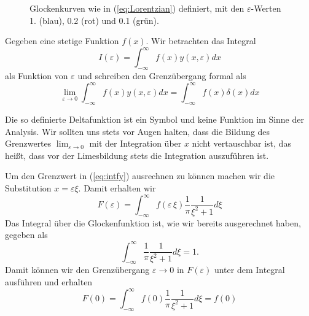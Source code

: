 \begin{figure}
  \begin{center}
  \end{center}
  \caption{\label{fig:Glockenkurven}Glockenkurven wie in (\ref{eq:Lorentzian})
  definiert, mit den $\varepsilon$-Werten 1. (blau), 0.2 (rot) und 0.1 (grün).}
\end{figure}
Gegeben eine stetige Funktion $f(x)$. Wir betrachten das Integral
\[I(\varepsilon)=\int_{-\infty}^{\infty}f(x)y(x,\varepsilon)dx\]
als Funktion von $\varepsilon$ und schreiben den Grenzübergang formal als
\begin{equation}\label{eq:intfy}
  \lim_{\varepsilon\rightarrow 0}\int_{-\infty}^{\infty}f(x)y(x,\varepsilon)dx=
\int_{-\infty}^{\infty}f(x)\delta(x)dx
\end{equation}

Die so definierte Deltafunktion ist ein Symbol und keine Funktion im Sinne der
Analysis. Wir sollten uns stets vor Augen halten, dass die Bildung des
Grenzwertes $\lim_{\varepsilon\rightarrow 0}$ mit der Integration über $x$
nicht vertauschbar ist, das heißt, dass vor der Limesbildung stets die
Integration auszuführen ist.\vspace{1cm}

Um den Grenzwert in (\ref{eq:intfy}) ausrechnen zu können machen wir die
Substitution $x=\varepsilon\xi$. Damit erhalten wir
\[ F(\varepsilon)=\int_{-\infty}^{\infty}f(\varepsilon\,\xi)
\frac{1}{\pi}\frac{1}{\xi^2+1}d\xi\]
Das Integral über die Glockenfunktion ist, wie wir bereits ausgerechnet haben,
gegeben als
\[\int_{-\infty}^{\infty}\frac{1}{\pi}\frac{1}{\xi^2+1}d\xi=1.\]
Damit können wir den Grenzübergang $\varepsilon\rightarrow 0$ in
$F(\varepsilon)$ unter dem Integral ausführen und erhalten
\[F(0)=\int_{-\infty}^{\infty}f(0)
\frac{1}{\pi}\frac{1}{\xi^2+1}d\xi=f(0)\]
